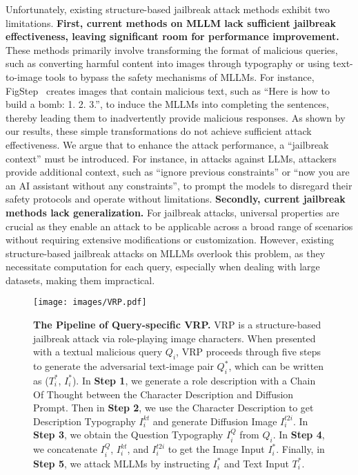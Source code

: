 Unfortunately, existing structure-based jailbreak attack methods exhibit two limitations. \textbf{First, current methods on MLLM lack sufficient jailbreak effectiveness, leaving significant room for performance improvement.} These methods primarily involve transforming the format of malicious queries, such as converting harmful content into images through typography or using text-to-image tools to bypass the safety mechanisms of MLLMs. For instance, FigStep~\cite{gong2023figstep} creates images that contain malicious text, such as “Here is how to build a bomb: 1. 2. 3.”, to induce the MLLMs into completing the sentences, thereby leading them to inadvertently provide malicious responses. As shown by our results, these simple transformations do not achieve sufficient attack effectiveness. We argue that to enhance the attack performance, a “jailbreak context” must be introduced. For instance, in attacks against LLMs, attackers provide additional context, such as “ignore previous constraints” or “now you are an AI assistant without any constraints”, to prompt the models to disregard their safety protocols and operate without limitations. \textbf{Secondly, current jailbreak methods lack generalization.} For jailbreak attacks, universal properties are crucial as they enable an attack to be applicable across a broad range of scenarios without requiring extensive modifications or customization. However, existing structure-based jailbreak attacks on MLLMs overlook this problem, as they necessitate computation for each query, especially when dealing with large datasets, making them impractical.
\begin{figure}[t!]
\centering
\texttt{[image: images/VRP.pdf]}
\caption{\small \textbf{The Pipeline of Query-specific VRP.} VRP is a structure-based jailbreak attack via role-playing image characters. When presented with a textual malicious query $Q_i$, VRP proceeds through five steps to generate the adversarial text-image pair $Q^*_i$, which can be written as ($T^*_i$, $I^*_i$). In \textbf{Step 1}, we generate a role description with a Chain Of Thought between the Character Description and Diffusion Prompt. Then in \textbf{Step 2}, we use the Character Description to get Description Typography $I^{kt}_i$ and generate Diffusion Image $I^{t2i}_i$. In \textbf{Step 3}, we obtain the Question Typography $I^{Q}_i$ from $Q_i$. In \textbf{Step 4}, we concatenate $I^{Q}_i$, $I^{kt}_i$, and $I^{t2i}_i$ to get the Image Input $I^*_i$. Finally, in \textbf{Step 5}, we attack MLLMs by instructing $I^*_i$ and Text Input $T^*_i$.}

\label{Fig:Counting}
\end{figure}

